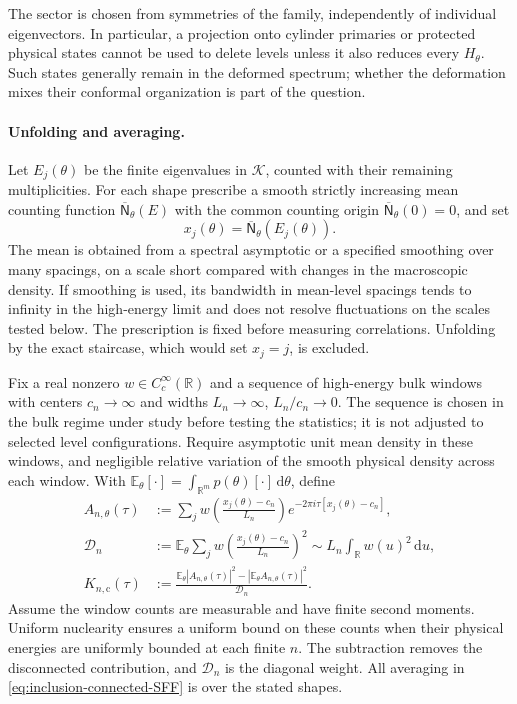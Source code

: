 \documentclass[a4paper,11pt]{article}
\theoremstyle{definition}
\begin{document}
The sector is chosen from symmetries of the family, independently of individual eigenvectors. In particular, a projection onto cylinder primaries or protected physical states cannot be used to delete levels unless it also reduces every $H_\theta$. Such states generally remain in the deformed spectrum; whether the deformation mixes their conformal organization is part of the question.

\paragraph{Unfolding and averaging.}
Let $E_j(\theta)$ be the finite eigenvalues in $\mathcal K$, counted with their remaining multiplicities. For each shape prescribe a smooth strictly increasing mean counting function $\overline{\mathsf N}_\theta(E)$ with the common counting origin $\overline{\mathsf N}_\theta(0)=0$, and set
\begin{equation}
 x_j(\theta)=\overline{\mathsf N}_\theta(E_j(\theta)).
 \label{eq:inclusion-unfolding}
\end{equation}
The mean is obtained from a spectral asymptotic or a specified smoothing over many spacings, on a scale short compared with changes in the macroscopic density. If smoothing is used, its bandwidth in mean-level spacings tends to infinity in the high-energy limit and does not resolve fluctuations on the scales tested below. The prescription is fixed before measuring correlations. Unfolding by the exact staircase, which would set $x_j=j$, is excluded.

Fix a real nonzero $w\in C_c^\infty(\mathbb R)$ and a sequence of high-energy bulk windows with centers $c_n\to\infty$ and widths $L_n\to\infty$, $L_n/c_n\to0$. The sequence is chosen in the bulk regime under study before testing the statistics; it is not adjusted to selected level configurations. Require asymptotic unit mean density in these windows, and negligible relative variation of the smooth physical density across each window. With
$\mathbb E_\theta[\cdot]=\int_{\mathbb R^m}p(\theta)[\cdot]\,\mathrm d\theta$, define
\begin{align}
 A_{n,\theta}(\tau)
   &:=\sum_j w\!\left(\frac{x_j(\theta)-c_n}{L_n}\right)
                e^{-2\pi i\tau[x_j(\theta)-c_n]},\nonumber\\
 \mathcal D_n
   &:=\mathbb E_\theta\sum_j
           w\!\left(\frac{x_j(\theta)-c_n}{L_n}\right)^2
     \sim L_n\int_{\mathbb R}w(u)^2\,\mathrm du,\nonumber\\
 K_{n,\mathrm c}(\tau)
   &:=\frac{\mathbb E_\theta|A_{n,\theta}(\tau)|^2
                -|\mathbb E_\theta A_{n,\theta}(\tau)|^2}{\mathcal D_n}.
 \label{eq:inclusion-connected-SFF}
\end{align}
Assume the window counts are measurable and have finite second moments. Uniform nuclearity ensures a uniform bound on these counts when their physical energies are uniformly bounded at each finite $n$. The subtraction removes the disconnected contribution, and $\mathcal D_n$ is the diagonal weight. All averaging in \eqref{eq:inclusion-connected-SFF} is over the stated shapes.
\end{document}
